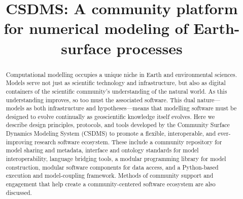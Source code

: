 \documentclass[journal abbreviation, manuscript]{copernicus}
\begin{document}
\title{CSDMS: A community platform for numerical modeling of Earth-surface processes}










\maketitle






\begin{abstract}
Computational modelling occupies a unique niche in Earth and environmental sciences. Models serve not just as scientific technology and infrastructure, but also as digital containers of the scientific community's understanding of the natural world. As this understanding improves, so too must the associated software. This dual nature---models as both infrastructure and hypotheses---means that modelling software must be designed to evolve continually as geoscientific knowledge itself evolves. Here we describe design principles, protocols, and tools developed by the Community Surface Dynamics Modeling System (CSDMS) to promote a flexible, interoperable, and ever-improving research software ecosystem. These include a community repository for model sharing and metadata, interface and ontology standards for model interoperability, language bridging tools, a modular programming library for model construction, modular software components for data access, and a Python-based execution and model-coupling framework. Methods of community support and engagement that help create a community-centered software ecosystem are also discussed.
\end{abstract}
\end{document}
